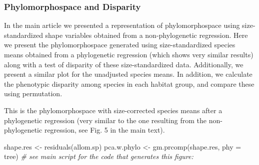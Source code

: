 \documentclass[
  11pt,
]{article}
\newenvironment{Shaded}{\begin{snugshade}}{\end{snugshade}}
\newcommand{\AttributeTok}[1]{\textcolor[rgb]{0.77,0.63,0.00}{#1}}
\newcommand{\CommentTok}[1]{\textcolor[rgb]{0.56,0.35,0.01}{\textit{#1}}}
\newcommand{\FunctionTok}[1]{\textcolor[rgb]{0.00,0.00,0.00}{#1}}
\newcommand{\NormalTok}[1]{#1}
\newcommand{\OtherTok}[1]{\textcolor[rgb]{0.56,0.35,0.01}{#1}}
\begin{document}
\hypertarget{phylomorphospace-and-disparity}{%
\subsubsection{Phylomorphospace and
Disparity}\label{phylomorphospace-and-disparity}}

In the main article we presented a representation of phylomorphospace
using size-standardized shape variables obtained from a non-phylogenetic
regression. Here we present the phylomorphospace generated using
size-standardized species means obtained from a phylogenetic regression
(which shows very similar results) along with a test of disparity of
these size-standardized data. Additionally, we present a similar plot
for the unadjusted species means. In addition, we calculate the
phenotypic disparity among species in each habitat group, and compare
these using permutation.

This is the phylomorphospace with size-corrected species means after a
phylogenetic regression (very similar to the one resulting from the
non-phylogenetic regression, see Fig. 5 in the main text).

\begin{Shaded}
\begin{Highlighting}[]
\NormalTok{shape.res }\OtherTok{\textless{}{-}} \FunctionTok{residuals}\NormalTok{(allom.sp)}
\NormalTok{pca.w.phylo }\OtherTok{\textless{}{-}} \FunctionTok{gm.prcomp}\NormalTok{(shape.res, }\AttributeTok{phy =}\NormalTok{ tree)}
\CommentTok{\# see main script for the code that generates this figure: }
\end{Highlighting}
\end{Shaded}
\end{document}
